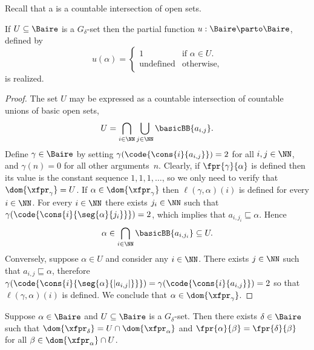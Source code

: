 %
Recall that a  is a countable intersection of open sets.

\begin{lemma}
  \label{th:G_delta_characteristic}%
  If $U \subseteq \Baire$ is a $G_\delta$-set then the partial
  function $u: \Baire \parto \Baire$, defined by
  \begin{equation*}
    u(\alpha) =
    \begin{cases}
      1 & \text{if $\alpha \in U$.}\\
      \text{undefined} & \text{otherwise,}
    \end{cases}
  \end{equation*}
  is realized.
\end{lemma}

\begin{proof}
  The set $U$ may be expressed as a countable intersection of countable unions of basic
  open sets,
  \begin{equation*}
    U = \bigcap_{i \in \NN}
        \bigcup_{j \in \NN} \basicBB{a_{i,j}}.
  \end{equation*}
  Define $\gamma \in \Baire$ by setting
  $\gamma(\code{\cons{i}{a_{i,j}}}) = 2$ for all $i, j \in \NN$,
  and $\gamma(n) = 0$ for all other arguments~$n$. Clearly, if
  $\fpr{\gamma}{\alpha}$ is defined then its value is the constant
  sequence $1, 1, 1, \ldots$, so we only need to verify that
  $\dom{\xfpr_\gamma} = U$. If $\alpha \in \dom{\xfpr_\gamma}$ then
  $\ell(\gamma,\alpha)(i)$ is defined for every $i \in \NN$.
  For every $i \in \NN$ there exists $j_i \in \NN$ such that $\gamma
  (\code{\cons{i}{\seg{\alpha}{j_i}}}) = 2$, which implies that $
  a_{i, j_i} \sqsubseteq \alpha$. Hence
  \begin{equation*}
    \alpha \in \bigcap_{i \in \NN} \basicBB{a_{i, j_i}} \subseteq U.
  \end{equation*}
  Conversely, suppose $\alpha \in U$ and consider any $i \in \NN$.
  There exists $j \in \NN$ such that $a_{i,j} \sqsubseteq \alpha$,
  therefore $\gamma (\code{\cons{i}{\seg{\alpha}{|a_{i,j}|}}}) =
  \gamma(\code{\cons{i}{a_{i,j}}}) = 2$ so that $\ell(\gamma,\alpha)(i)$ is defined. We conclude that $\alpha \in
  \dom{\xfpr_\gamma}$.
\end{proof}

\begin{lemma}
  \label{th:restrict_G_delta}%
  Suppose $\alpha \in \Baire$ and $U \subseteq \Baire$ is a $G_\delta$-set.
  Then there exists $\delta \in \Baire$ such that
  $\dom{\xfpr_\delta} = U \cap \dom{\xfpr_\alpha}$
  and
  $\fpr{\alpha}{\beta} = \fpr{\delta}{\beta}$
  for all $\beta \in \dom{\xfpr_\alpha} \cap U$.
\end{lemma}


